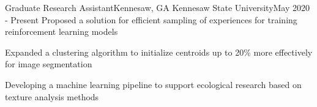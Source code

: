 \resumeSubheading
{Graduate Research Assistant}{Kennesaw, GA}
{Kennesaw State University}{May 2020 - Present}
\resumeItemListStart
\resumeItem
{
    Proposed a solution for efficient sampling of experiences for training
    reinforcement learning models
}

\resumeItem
{
    Expanded a clustering algorithm to initialize centroids up to 20\% more effectively for
    image segmentation
}

\resumeItem
{
    Developing a machine learning pipeline to support ecological research based on
    texture analysis methods
}
\resumeItemListEnd



